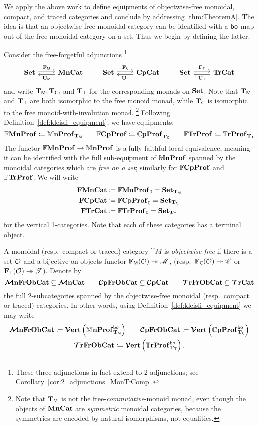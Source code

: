 \documentclass[11pt,oneside,article]{memoir}
\begin{document}
We apply the above work to define equipments of objectwise-free monoidal, compact, and traced
categories and conclude by addressing \ref{thm:TheoremA}. The idea is that an objectwise-free
monoidal category can be identified with a $\mathsf{bo}$-map out of the free monoidal category on a set.
Thus we begin by defining the latter.

Consider the free-forgetful adjunctions%
\footnote{
  These three adjunctions in fact extend to 2-adjunctions; see
  Corollary~\ref{cor:2_adjunctions_MonTrComp}.
}
\begin{equation}
    \label{eqn:adjunctions}
  \Adjoint{\Set}{\MonCat}{\FM}{\UM}
  \qquad
  \Adjoint{\Set}{\CompCat}{\FC}{\UC}
  \qquad
  \Adjoint{\Set}{\TrCat}{\FT}{\UT}
\end{equation}
and write $\mathbf{T}_{\mathsf{M}},\mathbf{T}_{\mathsf{C}},$ and $\mathbf{T}_{\mathsf{T}}$ for the corresponding monads on $\mathbf{Set}$. Note that $\mathbf{T}_{\mathsf{M}}$ and $\mathbf{T}_{\mathsf{T}}$ are
both isomorphic to the free monoid monad, while $\mathbf{T}_{\mathsf{C}}$ is isomorphic to the free
monoid-with-involution monad.%
\footnote{
   Note that $\mathbf{T}_{\mathsf{M}}$ is not the free-\emph{commutative}-monoid monad, even though the objects of
   $\mathbf{MnCat}$ are \emph{symmetric} monoidal categories, because the symmetries are encoded by natural
   isomorphisms, not equalities.
}
Following Definition~\ref{def:kleisli_equipment}, we have equipments:
\[
  \mathbb{F}\mathbf{MnProf}  \coloneqq \mathbb{M}\mathbf{nProf}_{\mathbf{T}_{\mathsf{M}}}
  \qquad
  \mathbb{F}\mathbf{CpProf} \coloneqq \mathbb{C}\mathbf{pProf}_{\mathbf{T}_{\mathsf{C}}}
  \qquad
  \mathbb{F}\mathbf{TrProf}   \coloneqq \mathbb{T}\mathbf{rProf}_{\mathbf{T}_{\mathsf{T}}}
\]
The functor $\mathbb{F}\mathbf{MnProf}\to\mathbb{M}\mathbf{nProf}$ is a fully faithful local equivalence, meaning it can be
identified with the full sub-equipment of $\mathbb{M}\mathbf{nProf}$ spanned by the monoidal categories which are
\emph{free on a set}; similarly for $\mathbb{F}\mathbf{CpProf}$ and $\mathbb{F}\mathbf{TrProf}$. We will write
\begin{align*}
  \mathbf{FMnCat}&\coloneqq\mathbb{F}\mathbf{MnProf}_0=\mathbf{Set}_{\mathbf{T}_{\mathsf{M}}}\\
  \mathbf{FCpCat}&\coloneqq\mathbb{F}\mathbf{CpProf}_0=\mathbf{Set}_{\mathbf{T}_{\mathsf{C}}}\\
  \mathbf{FTrCat}&\coloneqq\mathbb{F}\mathbf{TrProf}_0=\mathbf{Set}_{\mathbf{T}_{\mathsf{T}}}
\end{align*}
for the vertical 1-categories. Note that each of these categories has a terminal object.

\begin{definition}
    \label{def:free_on_objects}
  A monoidal (resp.\ compact or traced) category $\cat{M}$ is \emph{objectwise-free} if there is a
  set $\mathcal{O}$ and a bijective-on-objects functor $\mathbf{F}_{\mathsf{M}}(\mathcal{O})\twoheadrightarrow\mathscr{M}$, (resp.\
  $\mathbf{F}_{\mathsf{C}}(\mathcal{O})\twoheadrightarrow\mathscr{C}$ or $\mathbf{F}_{\mathsf{T}}(\mathcal{O})\twoheadrightarrow\mathscr{T}$). Denote by
  \[
    \bm{\mathcal{M}}\mathbf{nFrObCat}\subseteq\bm{\mathcal{M}}\mathbf{nCat}\qquad\bm{\mathcal{C}}\mathbf{pFrObCat}\subseteq\bm{\mathcal{C}}\mathbf{pCat}\qquad\bm{\mathcal{T}}\mathbf{rFrObCat}\subseteq\bm{\mathcal{T}}\mathbf{rCat}
  \]
  the full 2-subcategories spanned by the objectwise-free monoidal (resp.\ compact or traced)
  categories. In other words, using Definition~\ref{def:kleisli_equipment} we may write
  \begin{gather*}
    \bm{\mathcal{M}}\mathbf{nFrObCat} \coloneqq \bm{\mathcal{V}}\mathbf{ert}\left(\mathbb{M}\mathbf{nProf}_{\mathbf{T}_{\mathsf{M}}}^{\mathsf{bo}}\right) \qquad
    \bm{\mathcal{C}}\mathbf{pFrObCat} \coloneqq \bm{\mathcal{V}}\mathbf{ert}\left(\mathbb{C}\mathbf{pProf}_{\mathbf{T}_{\mathsf{C}}}^{\mathsf{bo}}\right) \\
    \bm{\mathcal{T}}\mathbf{rFrObCat} \coloneqq \bm{\mathcal{V}}\mathbf{ert}\left(\mathbb{T}\mathbf{rProf}_{\mathbf{T}_{\mathsf{T}}}^{\mathsf{bo}}\right).
  \end{gather*}
\end{definition}
\end{document}
